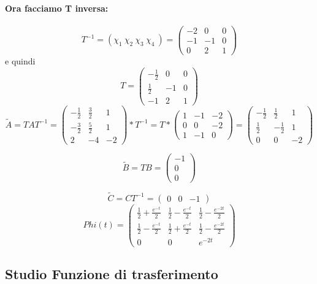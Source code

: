 \documentclass{article}
\begin{document}
\paragraph{Ora facciamo T inversa:} \[ T^{-1} = (\chi_1\ \chi_2\ \chi_3\ \chi_4\ ) = \left(\begin{matrix}-2 & 0 & 0\\-1 & -1 & 0\\0 & 2 & 1\end{matrix}\right) \]
e quindi \[T = \left(\begin{matrix}- \frac{1}{2} & 0 & 0\\\frac{1}{2} & -1 & 0\\-1 & 2 & 1\end{matrix}\right)\]
\[ \widetilde{A} = TAT^{-1} = \left(\begin{matrix}- \frac{1}{2} & \frac{3}{2} & 1\\- \frac{3}{2} & \frac{5}{2} & 1\\2 & -4 & -2\end{matrix}\right) * T^{-1} = T*\left(\begin{matrix}1 & -1 & -2\\0 & 0 & -2\\1 & -1 & 0\end{matrix}\right) =\left(\begin{matrix}- \frac{1}{2} & \frac{1}{2} & 1\\\frac{1}{2} & - \frac{1}{2} & 1\\0 & 0 & -2\end{matrix}\right) \]

\[ \widetilde{B} = T B = \left(\begin{matrix}-1\\0\\0\end{matrix}\right) \]

\[ \widetilde{C} = C T^{-1} = \left(\begin{matrix}0 & 0 & -1\end{matrix}\right) \]
\[Phi(t) = \left(\begin{matrix}\frac{1}{2} + \frac{e^{- t}}{2} & \frac{1}{2} - \frac{e^{- t}}{2} & \frac{1}{2} - \frac{e^{- 2 t}}{2}\\\frac{1}{2} - \frac{e^{- t}}{2} & \frac{1}{2} + \frac{e^{- t}}{2} & \frac{1}{2} - \frac{e^{- 2 t}}{2}\\0 & 0 & e^{- 2 t}\end{matrix}\right) \]

\subsection{Studio Funzione di trasferimento}
\end{document}
